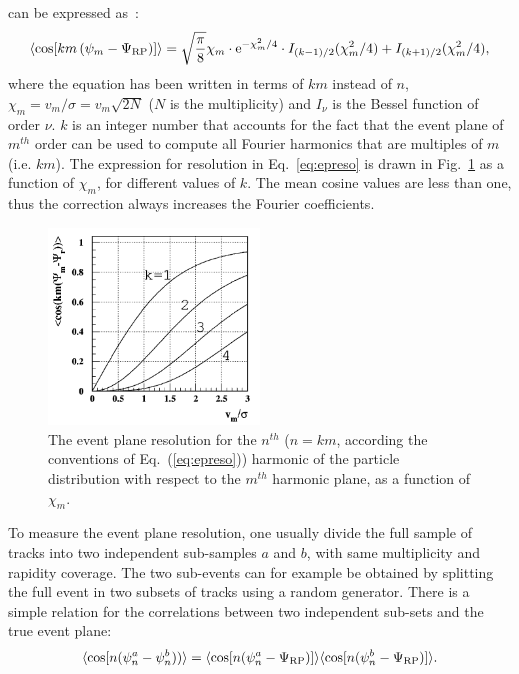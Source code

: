 can be expressed as~\cite{Poskanzer:1998yz}:
\begin{equation}
\label{eq:epreso}
\left\langle \cos [km\left( \psi_m-\Psi_{\rm RP}\right)]\right\rangle = \sqrt{\dfrac{\pi }{8}} \chi_m \cdot {\rm e}^{-\chi_m^2/4} \cdot I_{(k-1)/2}(\chi_m^2/4)+I_{(k+1)/2}(\chi_m^2/4),
\end{equation}
where the equation has been written in terms of $km$ 
instead of $n$, $\chi_m= v_m/\sigma = v_m\sqrt{2N}$ ($N$ is the multiplicity) and 
$I_\nu$ is the Bessel function of order $\nu$.
$k$ is an integer number that accounts for the fact that the 
event plane of $m^{th}$ order can be used to compute all Fourier harmonics that are multiples
of $m$ (i.e. $km$). The expression for resolution in Eq.~\ref{eq:epreso} is
drawn in Fig.~\ref{fig:resoBessel} as a function of $\chi_m$, for 
different values of $k$. 
The mean cosine values are less than one, thus the 
correction always increases the Fourier coefficients.
\begin{figure}
\centering
 \includegraphics[width=0.5\textwidth]{FigCap5/resolBessel.png}
 \caption[Event plane resolution vs $\chi_m$]{The event plane resolution for the $n^{ th}$ ($n=km$, according the conventions of Eq.~(\ref{eq:epreso})) harmonic of the particle distribution with respect to the $m^{ th}$ harmonic plane, as a function of $\chi_m$.}
 \label{fig:resoBessel}
\end{figure}
To measure the event plane resolution, one usually divide the
full sample of tracks into two independent sub-samples 
$a$ and $b$, with same multiplicity and rapidity coverage.
The two sub-events can for example be obtained by 
splitting the full event in two subsets of tracks using a random generator.
There is a simple relation for the correlations between 
two independent sub-sets and the true event plane:
\begin{equation}
\langle {\rm cos} [n({\rm \psi}^a_n-{\rm \psi}^b_n)) \rangle = 
\langle {\rm cos} [n({\rm \psi}^a_n-{\rm \Psi}_{\rm RP})] \rangle \langle {\rm cos} [n({\rm \psi}^b_n-{\rm \Psi}_{\rm RP})] \rangle .
\end{equation}
